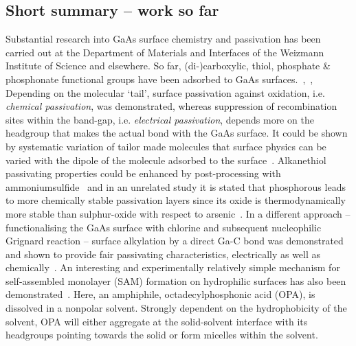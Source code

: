 \documentclass[a4paper]{article}
\begin{document}
\subsection*{Short summary -- work so far}
Substantial research into GaAs surface chemistry and passivation has been carried out at the Department of Materials and Interfaces of the Weizmann Institute of Science and elsewhere. So far, (di-)carboxylic, thiol, phosphate \& phosphonate functional groups have been adsorbed to GaAs surfaces.~\cite{Shpaisman1},~\cite{Shpaisman2},~\cite{thesis}\\
Depending on the molecular `tail', surface passivation against oxidation, i.e. \emph{chemical passivation}, was demonstrated, whereas suppression of recombination sites within the band-gap, i.e. \emph{electrical passivation}, depends more on the headgroup that makes the actual bond with the GaAs surface. It could be shown by systematic variation of tailor made molecules that surface physics can be varied with the dipole of the molecule adsorbed to the surface~\cite{VilanNature}. Alkanethiol passivating properties could be enhanced by post-processing with ammoniumsulfide~\cite{Dubowski} and in an unrelated study it is stated that phosphorous leads to more chemically stable passivation layers since its oxide is thermodynamically more stable than sulphur-oxide with respect to arsenic~\cite{oxidpaper}. 
In a different approach -- functionalising the GaAs surface with chlorine and subsequent nucleophilic Grignard reaction -- surface alkylation by a direct Ga-C bond was demonstrated and shown to provide fair passivating characteristics, electrically as well as chemically~\cite{Grignard}. An interesting and experimentally relatively simple mechanism for self-assembled monolayer (SAM) formation on hydrophilic surfaces has also been demonstrated~\cite{Nie}. Here, an amphiphile,  octadecylphosphonic acid (OPA), is dissolved in a nonpolar solvent. Strongly dependent on the hydrophobicity of the solvent, OPA will either aggregate at the solid-solvent interface with its headgroups pointing towards the solid or form micelles within the solvent. 
\end{document}
